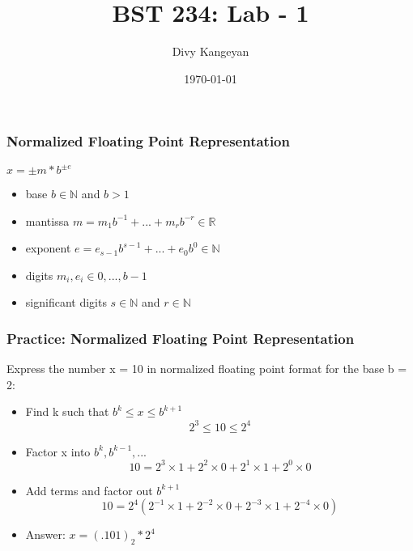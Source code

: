 \documentclass{beamer}
\title[BST 234]{BST 234: Lab - 1}
\author[Divy Kangeyan]{Divy Kangeyan}
\date{\today}
\begin{document}
	
	\begin{frame}
		\titlepage
	\end{frame}
	
	




\begin{frame}
\frametitle{Normalized Floating Point Representation}

\begin{center}
$x = \pm m * b^{\pm e}$
\end{center}

\begin{itemize}
\item base $b \in \mathbb{N}$ and $b > 1$
\item mantissa $m = m_1b^{-1}+...+m_rb^{-r} \in \mathbb{R}$
\item exponent $e = e_{s-1}b^{s-1}+...+e_0b^0 \in \mathbb{N}$
\item digits $m_i, e_i \in 0,...,b-1$
\item significant digits $s \in \mathbb{N}$ and $r \in \mathbb{N}$
\end{itemize}

\end{frame}

\begin{frame}
\frametitle{Practice: Normalized Floating Point Representation}

Express the number x = 10 in normalized floating point format for the base b = 2: 
\pause

\begin{itemize}
\item Find k such that $b^k \leq x \leq b^{k+1}$
$$2^3 \leq 10 \leq 2^4$$ \pause
\item Factor x into $b^k, b^{k-1},...$
$$10 = 2^3 \times 1 + 2^2 \times 0 + 2^1 \times 1 + 2^0 \times 0$$ \pause
\item Add terms and factor out $b^{k+1}$
$$10 = 2^4(2^{-1} \times 1 + 2^{-2} \times 0 + 2^{-3} \times 1 + 2^{-4} \times 0)$$ \pause
\item Answer: $x = (.101)_2 * 2^4$

\end{itemize}

\end{frame}
\end{document}
